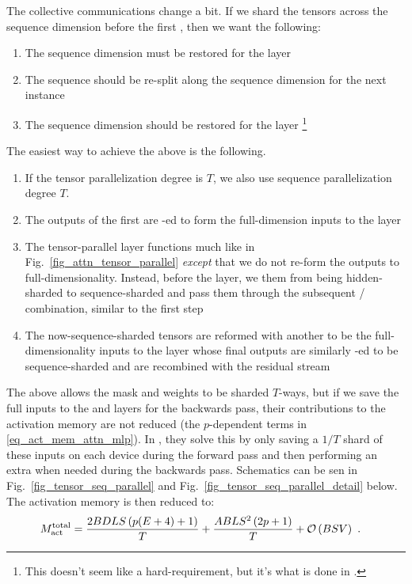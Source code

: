 \documentclass[11pt]{article}
\begin{document}
The collective communications change a bit. If we shard the tensors across the sequence dimension
before the first , then we want the following:
\begin{enumerate}
	\item The sequence dimension must be restored for the  layer
	\item The sequence should be re-split along the sequence dimension for the next  instance
	\item The sequence dimension should be restored for the  layer \footnote{This doesn't
		      seem like a hard-requirement, but it's what is done in \cite{korthikanti2022reducing}.}
\end{enumerate}

The easiest way to achieve the above is the following.
\begin{enumerate}
	\item If the tensor parallelization degree is $ T $, we also use sequence parallelization degree $ T
	      $.
	\item The outputs of the first  are -ed to form the full-dimension
	      inputs to the   layer
	\item The tensor-parallel  layer functions much like in
	      Fig.~\ref{fig_attn_tensor_parallel} \textit{except} that we do not re-form the outputs to
	      full-dimensionality.  Instead, before the  layer, we  them
	      from being hidden-sharded to sequence-sharded and pass them through the subsequent
	      / combination, similar to the first step
	\item The now-sequence-sharded tensors are reformed with another  to be the full-dimensionality inputs to the
	       layer whose final outputs are similarly -ed to be
	      sequence-sharded and are recombined with the residual stream
\end{enumerate}
The above allows the  mask and  weights to be sharded $ T
$-ways, but if we save the full inputs to the  and   layers
for the backwards pass, their contributions to the activation memory are not reduced (the $ p
$-dependent terms in \eqref{eq_act_mem_attn_mlp}). In \cite{korthikanti2022reducing}, they solve
this by only saving a $ 1/T $ shard of these inputs on each device during the forward pass and then
performing an extra  when needed during the backwards pass. Schematics can be
sen in Fig.~\ref{fig_tensor_seq_parallel} and Fig.~\ref{fig_tensor_seq_parallel_detail} below. The
activation memory is then reduced to:
\begin{align}
	M _{ {\rm act}  } ^{ {\rm  total}  } & =\frac{ 2BDLS   \left ( p(E+4) + 1   \right ) }{ T }
	+ \frac{ ABLS ^{ 2 } \left ( 2p+1\right ) }{ T }  + \mathcal{O} \left( BSV \right) \label{eq_act_mem_total_seq_parallel}\ .
\end{align}
\end{document}
